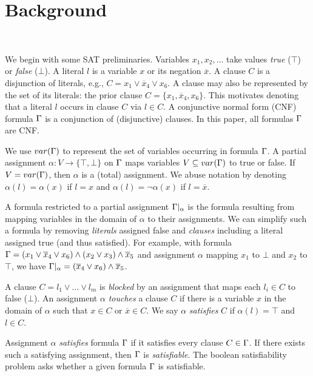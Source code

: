 \section{Background}~\label{sec:background}

We begin with some SAT preliminaries. Variables $x_1, x_2, ...$ take values
\emph{true} ($\top$) or \emph{false} ($\bot$). A literal $l$ is a variable
$x$ or its negation $\overline{x}$. A clause $C$ is a disjunction of literals,
e.g., $C = x_1 \lor \overline{x}_4 \lor x_6$. A clause may also be represented by the set of its literals:
the prior clause $C = \{x_1, \overline{x}_4, x_6\}$. This motivates denoting that a literal
$l$ occurs in clause $C$ via $l \in C$. A conjunctive normal form (CNF)
formula $\Gamma$ is a conjunction of (disjunctive) clauses. In this paper,
all formulas $\Gamma$ are CNF.

We use $var(\Gamma)$ to represent the set of variables occurring in formula $\Gamma$.
A partial assignment $\alpha : V \rightarrow \{\top, \bot\}$ on $\Gamma$
maps variables $V \subseteq var(\Gamma)$ to true or false. If $V
= var(\Gamma)$, then $\alpha$ is a (total) assignment. We abuse notation by
denoting $\alpha(l) = \alpha(x)$ if $l = x$ and $\alpha(l) = \neg \alpha(x)$ if
$l = \overline{x}$.

A formula restricted to a partial assignment $\Gamma|_\alpha$ is the formula resulting from
mapping variables in the domain of $\alpha$ to their assignments. We can
simplify such a formula by removing \emph{literals} assigned false and
\emph{clauses} including a literal assigned true (and thus satisfied).
For example, with formula $\Gamma =
(x_1 \lor \overline{x}_4 \lor x_6) \land (x_2 \lor x_3) \land \overline{x}_5$
and assignment $\alpha$ mapping $x_1$ to $\bot$ and $x_2$ to $\top$,
we have $\Gamma|_\alpha = (\overline{x}_4 \lor x_6) \land \overline{x}_5$.

A clause $C = l_1 \lor \dots \lor l_m$ is \emph{blocked} by an assignment
that maps each $l_i \in C$ to false ($\bot$). An assignment $\alpha$
\emph{touches} a clause $C$ if there is a variable $x$ in the domain of $\alpha$
such that $x \in C$ or $\overline{x} \in C$. We say $\alpha$ \emph{satisfies}
$C$ if $\alpha(l) = \top$ and $l \in C$.

Assignment $\alpha$ \emph{satisfies} formula $\Gamma$ if it satisfies every
clause $C \in \Gamma$. If there exists such a satisfying assignment, then $\Gamma$ is
\emph{satisfiable}. The boolean satisfiability problem asks whether a given
formula $\Gamma$ is satisfiable.

